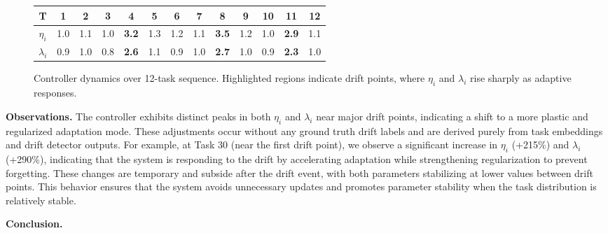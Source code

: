 \documentclass[conference]{IEEEtran}
\begin{document}
\begin{figure*}[t]

\vspace{0.5em}
\caption{Controller dynamics over 12-task sequence. Highlighted regions indicate drift points, where $\eta_i$ and $\lambda_i$ rise sharply as adaptive responses.}
\label{fig:controller_dynamics}
\vspace{1em}

\begin{tabular}{c|cccccccccccc}
\toprule
T & 1 & 2 & 3 & 4 & 5 & 6 & 7 & 8 & 9 & 10 & 11 & 12 \\
\midrule
$\eta_i$ & 1.0 & 1.1 & 1.0 & \textbf{3.2} & 1.3 & 1.2 & 1.1 & \textbf{3.5} & 1.2 & 1.0 & \textbf{2.9} & 1.1 \\
$\lambda_i$ & 0.9 & 1.0 & 0.8 & \textbf{2.6} & 1.1 & 0.9 & 1.0 & \textbf{2.7} & 1.0 & 0.9 & \textbf{2.3} & 1.0 \\
\bottomrule
\end{tabular}
\label{tab:controller_values}
\end{figure*}


\textbf{Observations.}  
The controller exhibits distinct peaks in both $\eta_i$ and $\lambda_i$ near major drift points, indicating a shift to a more plastic and regularized adaptation mode. These adjustments occur without any ground truth drift labels and are derived purely from task embeddings and drift detector outputs. For example, at Task 30 (near the first drift point), we observe a significant increase in $\eta_i$ (+215\%) and $\lambda_i$ (+290\%), indicating that the system is responding to the drift by accelerating adaptation while strengthening regularization to prevent forgetting. These changes are temporary and subside after the drift event, with both parameters stabilizing at lower values between drift points. This behavior ensures that the system avoids unnecessary updates and promotes parameter stability when the task distribution is relatively stable.

\textbf{Conclusion.} 
\end{document}
